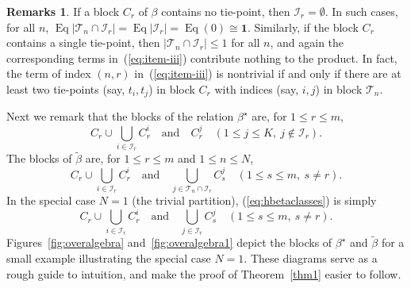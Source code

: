 \documentclass{au}
\numberwithin{equation}{section}
\theoremstyle{plain}
\theoremstyle{definition}
\newtheorem*{remarks}{Remarks}
\newcommand{\<}{\ensuremath{\langle}}
\renewcommand{\>}{\ensuremath{\rangle}}
\newcommand{\sT}{\ensuremath{\mathscr{T}}}
\newcommand{\sI}{\ensuremath{\mathcal{I}}}
\DeclareMathOperator{\Eq}{Eq}
\renewcommand{\leq}{\ensuremath{\leqslant}}
\newcommand{\one}{\ensuremath{\mathbf{1}}}
\newcommand{\tbeta}{\ensuremath{\widetilde{\beta}}}
\begin{document}
\begin{remarks}
If a block $C_r$ of $\beta$ contains no tie-point, then
$\sI_r = \emptyset$. In such cases,
for all $n$,
$\Eq |\sT_n \cap \sI_r| = \Eq |\sI_r| = \Eq (0)
\cong \one$.
  Similarly, if the block $C_r$ contains a single tie-point, then $|\sT_n \cap
  \sI_r|\leq 1$ for all $n$, and
  again the corresponding terms in~(\ref{eq:item-iii}) contribute nothing to the
  product.
In fact, the term of index $(n,r)$ in~(\ref{eq:item-iii}) is nontrivial if and only if there
are at least two tie-points (say, $t_i, t_j$) in block $C_r$ with indices (say, $i, j$) in block $\sT_n$.

Next we remark that the blocks of the relation $\beta^\star$ are, for $1\leq r\leq m$,
\begin{equation}
  \label{eq:betastartclasses}
C_r \cup \bigcup_{i\in \sI_r}C_r^i \quad
\text{and} \quad
C^j_r \quad (1\leq j\leq K, \ j\notin \sI_r).
\end{equation}
The blocks of $\tbeta$ are, for $1\leq r\leq m$ and
$1\leq n \leq N$,
\begin{equation}
  \label{eq:hbetaclasses}
C_r \cup \bigcup_{i\in \sI_r}C_r^i   \quad \text{and} \quad
\bigcup_{j\in \sT_n \cap \sI_r}C^j_s \quad (1\leq s\leq m, \ s\neq r).
\end{equation}
In the special case $N=1$ (the trivial partition), (\ref{eq:hbetaclasses}) is simply
\[
C_r \cup \bigcup_{i\in \sI_r}C_r^i   \quad \text{and} \quad
\bigcup_{j\in \sI_r}C^j_s \quad (1\leq s\leq m, \ s\neq r).
\]
Figures~\ref{fig:overalgebra} and~\ref{fig:overalgebra1} depict the blocks of $\beta^\star$
and $\tbeta$ for a small example illustrating the special case $N=1$.
These diagrams serve as a rough guide to intuition,
and make the proof of Theorem~\ref{thm1} easier to follow.
\end{remarks}
\end{document}
